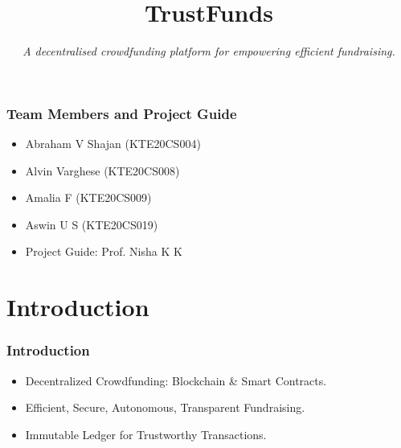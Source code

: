 \documentclass{beamer}
\title[SkillVine]{\textbf{TrustFunds}}
\subtitle{\textit{A decentralised crowdfunding platform for empowering efficient fundraising.}}
\date{}
\begin{document}
{
\begin{frame}[plain]
  \vspace{60pt}
  \centering
  \maketitle
\end{frame}
}

{
\begin{frame}
  \frametitle{Team Members and Project Guide}
  \begin{itemize}
    \item Abraham V Shajan (KTE20CS004)
    \item Alvin Varghese (KTE20CS008)
    \item Amalia F (KTE20CS009)
    \item Aswin U S (KTE20CS019)
    \vspace{10pt}
    \item Project Guide: Prof. Nisha K K
  \end{itemize}
\end{frame}
}

\section{Introduction}
\begin{frame}
  \frametitle{Introduction}
  \begin{itemize}
    \item Decentralized Crowdfunding: Blockchain \& Smart Contracts.
    \vspace{10pt}
    \item Efficient, Secure, Autonomous, Transparent Fundraising.
    \vspace{10pt}
    \item Immutable Ledger for Trustworthy Transactions.
    \vspace{10pt}
  \end{itemize}
\end{frame}
\end{document}
